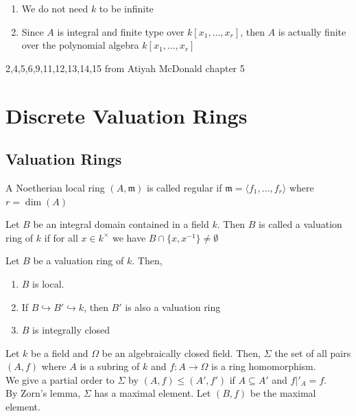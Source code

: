 \documentclass[oneside, 12pt]{scrbook}
\newcommand{\m}{\mathfrak{m}}
\theoremstyle{theorem}
\begin{document}
\begin{remark}
\begin{enumerate}
\item We do not need $k$ to be infinite
\item Since $A$ is integral and finite type over $k[x_{1}, \hdots ,x_{r}]$, then $A$ is actually finite over the polynomial algebra $k[x_{1},\hdots , x_{r}]$
\end{enumerate}
\end{remark}

\begin{exercise}
2,4,5,6,9,11,12,13,14,15 from Atiyah McDonald chapter 5
\end{exercise}

\chapter{Discrete Valuation Rings}

\section{Valuation Rings}

\begin{definition}
A Noetherian local ring $(A, \m)$ is called regular if $\m = \langle f_{1} , \hdots , f_{r} \rangle$ where $r = \dim(A)$
\end{definition}

\begin{definition}
Let $B$ be an integral domain contained in a field $k$. Then $B$ is called a valuation ring of $k$ if for all $x\in k^{\times}$ we have $B \cap \{x,x^{-1}\} \neq \emptyset$
\end{definition}

\begin{proposition}
Let $B$ be a valuation ring of $k$. Then, 
\begin{enumerate}
\item $B$ is local.
\item If $B \hookrightarrow B' \hookrightarrow k$, then $B'$ is also a valuation ring
\item $B$ is integrally closed
\end{enumerate}
\end{proposition}

Let $k$ be a field and $\Omega$ be an algebraically closed field. Then, $\Sigma$ the set of all pairs $(A,f)$ where $A$ is a subring of $k$ and $f: A \rightarrow \Omega$ is a ring homomorphism. \\
We give a partial order to $\Sigma$ by $(A,f) \le (A',f')$ if $A \subseteq A'$ and $f|'_{A} = f$.\\
By Zorn's lemma, $\Sigma$ has a maximal element. Let $(B,f)$ be the maximal element. 
\end{document}
